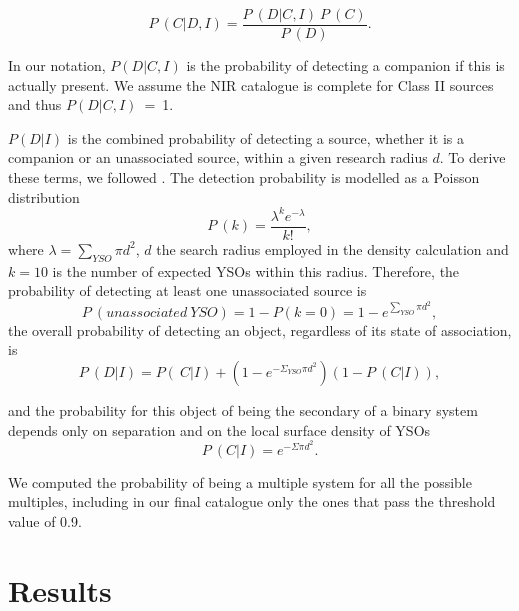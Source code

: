 \documentclass{aa}
\begin{document}
\begin{equation}
    P~(C|D,I) = \frac{P~(D|C,I)~P~(C)}{P~(D)}.
\end{equation}
\par
In our notation, $P(D|C,I)$ is the probability of detecting a companion if this is actually present. We assume the NIR catalogue is complete for Class II sources and thus $P(D|C,I)$~=~1. \par
$P(D|I)$ is the combined probability of detecting a source, whether it is a companion or an unassociated source, within a given research radius $d$. To derive these terms, we followed \cite{Tobin_2022}. The detection probability is modelled as a Poisson distribution
\begin{equation}
    P~(k) = \frac{\lambda^k e^{-\lambda}}{k!},
\end{equation}
where $\lambda = \sum_{YSO} \pi d^2$, $d$ the search radius employed in the density calculation and $k=10$ is the number of expected YSOs within this radius. Therefore, the probability of detecting at least one unassociated source is 
\begin{equation}
    P~(unassociated~YSO) = 1 - P(k=0) = 1 - e^{\sum_{YSO} \pi d^2},
\end{equation}
the overall probability of detecting an object, regardless of its state of association, is
\begin{equation} 
    P~(D|I) = P(~C|I) + (1 - e^{-\Sigma_{YSO}\pi d^2}) (1 - P~(C|I)),
\end{equation}
\par
and the probability for this object of being the secondary of a binary system depends only on separation and on the local surface density of YSOs
\begin{equation}
     P~(C|I) = e^{-\Sigma \pi d^2}.
\end{equation}
\par
We computed the probability of being a multiple system for all the possible multiples, including in our final catalogue only the ones that pass the threshold value of 0.9.


\section{Results} \label{section3}
\end{document}
